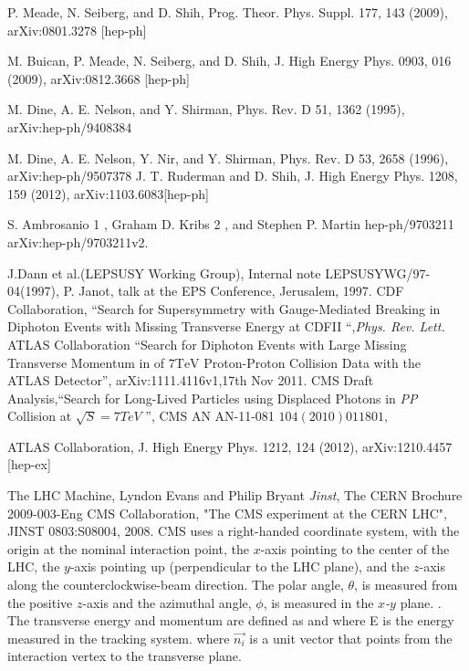 \begin{thebibliography}{9}
P. Meade, N. Seiberg, and D. Shih, Prog. Theor. Phys.
Suppl. 177, 143 (2009), arXiv:0801.3278 [hep-ph]

M. Buican, P. Meade, N. Seiberg, and D. Shih, J. High Energy Phys. 0903, 016 (2009), arXiv:0812.3668 [hep-ph]

M. Dine, A. E. Nelson, and Y. Shirman, Phys. Rev. D
51, 1362 (1995), arXiv:hep-ph/9408384

M. Dine, A. E. Nelson, Y. Nir, and Y. Shirman, Phys.
Rev. D 53, 2658 (1996), arXiv:hep-ph/9507378
 J. T. Ruderman and D. Shih, J. High Energy Phys.
1208, 159 (2012), arXiv:1103.6083[hep-ph]

 S. Ambrosanio 1 , Graham D. Kribs 2 , and Stephen P. Martin hep-ph/9703211 arXiv:hep-ph/9703211v2.


J.Dann et al.(LEPSUSY Working Group), Internal note LEPSUSYWG/97-04(1997), P. Janot, talk at the EPS Conference, Jerusalem, 1997.
CDF Collaboration, ``Search for Supersymmetry with Gauge-Mediated Breaking in Diphoton Events with Missing Transverse Energy at CDFII ``,\emph{Phys. Rev. Lett.}
 ATLAS Collaboration ``Search for Diphoton Events with Large Missing Transverse Momentum in  of $\text{7TeV}$ Proton-Proton Collision Data with the ATLAS Detector'', arXiv:1111.4116v1,17th Nov 2011. 
CMS Draft Analysis,``Search for Long-Lived Particles using Displaced Photons in \emph{PP} Collision at $\sqrt{S}=7TeV$ '', CMS AN AN-11-081 \emph{$104(2010) 011801,$}

ATLAS Collaboration, J. High Energy Phys. 1212, 124
(2012), arXiv:1210.4457 [hep-ex]

 The LHC Machine, Lyndon Evans and Philip Bryant \textit{Jinst},
 The CERN Brochure 2009-003-Eng
CMS Collaboration, "The CMS experiment at the CERN LHC", JINST 0803:S08004, 2008.
CMS uses a right-handed coordinate system, with the origin at the nominal interaction point, the \emph{$x$}-axis pointing to the center of the LHC, 
the \emph{$y$}-axis pointing up (perpendicular to the LHC plane), and the \emph{$z$}-axis along the counterclockwise-beam direction. The polar angle, $\theta$, 
is measured from the positive \emph{$z$}-axis and the azimuthal angle, $\phi$, is measured in the \emph{$x$-$y$} plane. . 
The transverse energy and momentum are defined as  and  where \textsc{E} is the energy measured in the 
tracking system. where $\vec{n_{i}}$ is a unit vector that points from the interaction vertex to the transverse plane.


\end{thebibliography}
